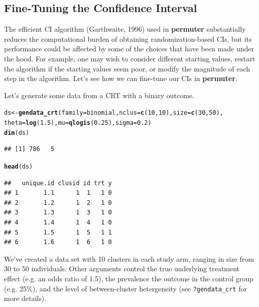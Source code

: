\documentclass[12pt]{article}\usepackage[]{graphicx}\usepackage[]{color}
\makeatletter
\newcommand{\hlnum}[1]{\textcolor[rgb]{0.686,0.059,0.569}{#1}}%
\newcommand{\hlstd}[1]{\textcolor[rgb]{0.345,0.345,0.345}{#1}}%
\newcommand{\hlkwb}[1]{\textcolor[rgb]{0.69,0.353,0.396}{#1}}%
\newcommand{\hlkwc}[1]{\textcolor[rgb]{0.333,0.667,0.333}{#1}}%
\newcommand{\hlkwd}[1]{\textcolor[rgb]{0.737,0.353,0.396}{\textbf{#1}}}%
\newenvironment{kframe}{%
 \def\at@end@of@kframe{}%
 \ifinner\ifhmode%
  \def\at@end@of@kframe{\end{minipage}}%
  \begin{minipage}{\columnwidth}%
 \fi\fi%
 \def\FrameCommand##1{\hskip\@totalleftmargin \hskip-\fboxsep
 \colorbox{shadecolor}{##1}\hskip-\fboxsep
     \hskip-\linewidth \hskip-\@totalleftmargin \hskip\columnwidth}%
 \MakeFramed {\advance\hsize-\width
   \@totalleftmargin\z@ \linewidth\hsize
   \@setminipage}}%
 {\par\unskip\endMakeFramed%
 \at@end@of@kframe}
\newenvironment{knitrout}{}{} %
\makeatother
\begin{document}
\subsection{Fine-Tuning the Confidence Interval}
The efficient CI algorithm (Garthwaite, 1996) used in \textbf{permuter} substantially reduces the computational burden of obtaining randomization-based CIs, but its performance could be affected by some of the choices that have been made under the hood. For example, one may wish to consider different starting values, restart the algorithm if the starting values seem poor, or modify the magnitude of each step in the algorithm. Let's see how we can fine-tune our CIs in \textbf{permuter}.

Let's generate some data from a CRT with a binary outcome.
\begin{knitrout}
\color{fgcolor}\begin{kframe}
\begin{alltt}
\hlstd{ds} \hlkwb{<-} \hlkwd{gendata_crt}\hlstd{(}\hlkwc{family} \hlstd{= binomial,} \hlkwc{nclus} \hlstd{=} \hlkwd{c}\hlstd{(}\hlnum{10}\hlstd{,} \hlnum{10}\hlstd{),} \hlkwc{size} \hlstd{=} \hlkwd{c}\hlstd{(}\hlnum{30}\hlstd{,} \hlnum{50}\hlstd{),}
                  \hlkwc{theta} \hlstd{=} \hlkwd{log}\hlstd{(}\hlnum{1.5}\hlstd{),} \hlkwc{mu} \hlstd{=} \hlkwd{qlogis}\hlstd{(}\hlnum{0.25}\hlstd{),} \hlkwc{sigma} \hlstd{=} \hlnum{0.2}\hlstd{)}
\hlkwd{dim}\hlstd{(ds)}
\end{alltt}
\begin{verbatim}
## [1] 786   5
\end{verbatim}
\begin{alltt}
\hlkwd{head}\hlstd{(ds)}
\end{alltt}
\begin{verbatim}
##   unique.id clusid id trt y
## 1       1.1      1  1   1 0
## 2       1.2      1  2   1 0
## 3       1.3      1  3   1 0
## 4       1.4      1  4   1 0
## 5       1.5      1  5   1 1
## 6       1.6      1  6   1 0
\end{verbatim}
\end{kframe}
\end{knitrout}
\noindent We've created a data set with 10 clusters in each study arm, ranging in size from 30 to 50 individuals. Other arguments control the true underlying treatment effect (e.g. an odds ratio of 1.5), the prevalence the outcome in the control group (e.g. 25\%), and the level of between-cluster hetergeneity (see \texttt{?gendata\_crt} for more details).
\end{document}
